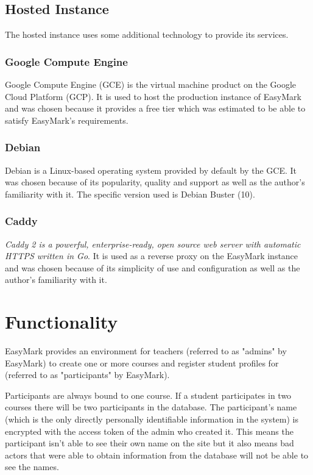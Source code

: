 \documentclass[12pt,a4paper,oneside]{report}
\begin{document}
	\subsection{Hosted Instance}
	The hosted instance uses some additional technology to provide its services.

	\subsubsection{Google Compute Engine} \label{subsubsec:googlecomputeengine}
	Google Compute Engine (GCE) is the virtual machine product on the Google Cloud Platform (GCP)\parencite{gcewebsite}. It is used to host the production instance of EasyMark and was chosen because it provides a free tier which was estimated to be able to satisfy EasyMark's requirements.

	\subsubsection{Debian} \label{subsubsec:debian}
	Debian is a Linux-based operating system\parencite{aboutdebian} provided by default by the GCE. It was chosen because of its popularity, quality and support as well as the author's familiarity with it. The specific version used is Debian Buster (10).

	\subsubsection{Caddy} \label{subsubsec:caddy}
	\emph{Caddy 2 is a powerful, enterprise-ready, open source web server with automatic HTTPS written in Go}\parencite{caddywebsite}. It is used as a reverse proxy on the EasyMark instance and was chosen because of its simplicity of use and configuration as well as the author's familiarity with it.

	\section{Functionality}
	EasyMark provides an environment for teachers (referred to as "admins" by EasyMark) to create one or more courses and register student profiles for (referred to as "participants" by EasyMark).

	Participants are always bound to one course. If a student participates in two courses there will be two participants in the database. The participant's name (which is the only directly personally identifiable information in the system) is encrypted with the access token of the admin who created it. This means the participant isn't able to see their own name on the site but it also means bad actors that were able to obtain information from the database will not be able to see the names.
\end{document}

